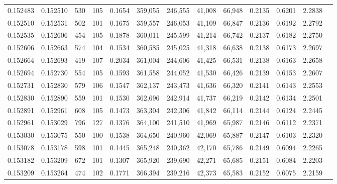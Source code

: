\begin{tabular}{rrrrrrrrrrrrr}
0.152483 & 0.152510 &   530 & 105 &                                     0.1654 & 359,055 & 246,555 &  41,008 &  66,948 & 0.2135 & 0.6201 & 2.2838 \\
0.152510 & 0.152531 &   502 & 101 &                                     0.1675 & 359,557 & 246,053 &  41,109 &  66,847 & 0.2136 & 0.6192 & 2.2792 \\
0.152535 & 0.152606 &   454 & 105 &                                     0.1878 & 360,011 & 245,599 &  41,214 &  66,742 & 0.2137 & 0.6182 & 2.2750 \\
0.152606 & 0.152663 &   574 & 104 &                                     0.1534 & 360,585 & 245,025 &  41,318 &  66,638 & 0.2138 & 0.6173 & 2.2697 \\
0.152664 & 0.152693 &   419 & 107 &                                     0.2034 & 361,004 & 244,606 &  41,425 &  66,531 & 0.2138 & 0.6163 & 2.2658 \\
0.152694 & 0.152730 &   554 & 105 &                                     0.1593 & 361,558 & 244,052 &  41,530 &  66,426 & 0.2139 & 0.6153 & 2.2607 \\
0.152731 & 0.152830 &   579 & 106 &                                     0.1547 & 362,137 & 243,473 &  41,636 &  66,320 & 0.2141 & 0.6143 & 2.2553 \\
0.152830 & 0.152890 &   559 & 101 &                                     0.1530 & 362,696 & 242,914 &  41,737 &  66,219 & 0.2142 & 0.6134 & 2.2501 \\
0.152891 & 0.152961 &   608 & 105 &                                     0.1473 & 363,304 & 242,306 &  41,842 &  66,114 & 0.2144 & 0.6124 & 2.2445 \\
0.152961 & 0.153029 &   796 & 127 &                                     0.1376 & 364,100 & 241,510 &  41,969 &  65,987 & 0.2146 & 0.6112 & 2.2371 \\
0.153030 & 0.153075 &   550 & 100 &                                     0.1538 & 364,650 & 240,960 &  42,069 &  65,887 & 0.2147 & 0.6103 & 2.2320 \\
0.153078 & 0.153178 &   598 & 101 &                                     0.1445 & 365,248 & 240,362 &  42,170 &  65,786 & 0.2149 & 0.6094 & 2.2265 \\
0.153182 & 0.153209 &   672 & 101 &                                     0.1307 & 365,920 & 239,690 &  42,271 &  65,685 & 0.2151 & 0.6084 & 2.2203 \\
0.153209 & 0.153264 &   474 & 102 &                                     0.1771 & 366,394 & 239,216 &  42,373 &  65,583 & 0.2152 & 0.6075 & 2.2159 \\

\end{tabular}
